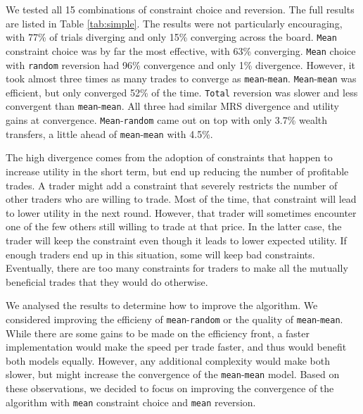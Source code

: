 \documentclass[12pt,a4paper,titlepage]{article}
\newcommand{\co}[1]{\texttt{#1}}
\begin{document}
We tested all 15 combinations of constraint choice and reversion.
The full results are listed in Table \ref{tab:simple}.
The results were not particularly encouraging, with 77\% of trials diverging and only 15\% converging across the board.
\co{Mean} constraint choice was by far the most effective, with 63\% converging.
\co{Mean} choice with \co{random} reversion had 96\% convergence and only 1\% divergence.
However, it took almost three times as many trades to converge as \co{mean}-\co{mean}.
\co{Mean}-\co{mean} was efficient, but only converged 52\% of the time.
\co{Total} reversion was slower and less convergent than \co{mean}-\co{mean}.
All three had similar MRS divergence and utility gains at convergence.
\co{Mean}-\co{random} came out on top with only 3.7\% wealth transfers, a little ahead of \co{mean}-\co{mean} with 4.5\%.

The high divergence comes from the adoption of constraints that happen to increase utility in the short term, but end up reducing the number of profitable trades.
A trader might add a constraint that severely restricts the number of other traders who are willing to trade.
Most of the time, that constraint will lead to lower utility in the next round.
However, that trader will sometimes encounter one of the few others still willing to trade at that price.
In the latter case, the trader will keep the constraint even though it leads to lower expected utility.
If enough traders end up in this situation, some will keep bad constraints.
Eventually, there are too many constraints for traders to make all the mutually beneficial trades that they would do otherwise.

We analysed the results to determine how to improve the algorithm.
We considered improving the efficieny of \co{mean}-\co{random} or the quality of \co{mean}-\co{mean}.
While there are some gains to be made on the efficiency front, a faster implementation would make the speed per trade faster, and thus would benefit both models equally.
However, any additional complexity would make both slower, but might increase the convergence of the \co{mean}-\co{mean} model.
Based on these observations, we decided to focus on improving the convergence of the algorithm with \co{mean} constraint choice and \co{mean} reversion.
\end{document}
